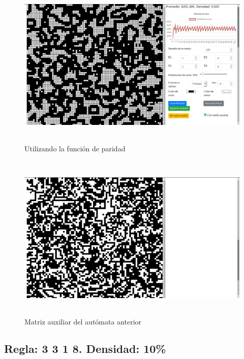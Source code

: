 \documentclass[12pt, titlepage]{article}
\begin{document}
\begin{figure}[H]
\begin{center}
 \includegraphics[width=15cm, height=8cm]{./img/1616-paridad.png}
 \caption{Utilizando la función de paridad}
 \label{fig:1616-paridad}
\end{center}
\end{figure}

\begin{figure}[H]
\begin{center}
 \includegraphics[width=15cm, height=8cm]{./img/1616-paridad-aux.png}
 \caption{Matriz auxiliar del autómata anterior}
 \label{fig:1616-paridad-aux}
\end{center}
\end{figure}

\subsection{Regla: 3 3 1 8. Densidad: 10\%}
\end{document}
